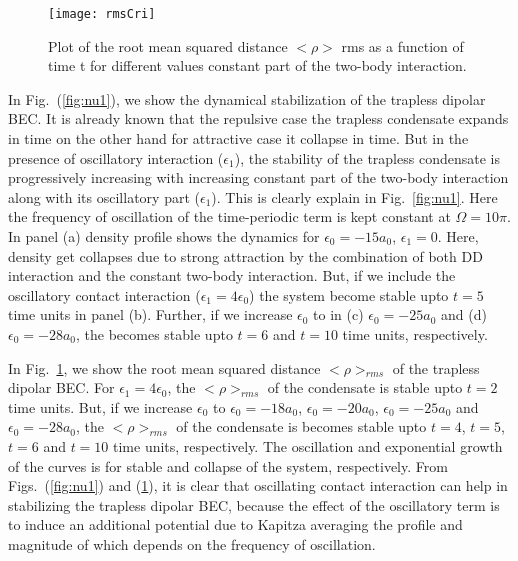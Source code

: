 \documentclass[amsmath,amssymb,article,twocolumn,superscriptaddress,showpacs,10pt]{revtex4-1}
\begin{document}
\begin{figure}[h!]
\begin{center}
\texttt{[image: rmsCri]}
\end{center}
\caption{Plot of the root mean squared distance $<\rho>$ rms as a function of time t for different values  constant part of the two-body interaction.}
\label{fig:nu1rms}
\end{figure}
In Fig.~(\ref{fig:nu1}), we show the dynamical stabilization of the trapless dipolar BEC. It is already known that the repulsive case the trapless condensate expands in time on the other hand for attractive case it collapse in time. But in the presence of oscillatory interaction ($\epsilon_{1}$), the stability of the trapless condensate is progressively increasing with increasing constant part of the two-body interaction along with its oscillatory part ($\epsilon_{1}$). This is clearly explain in Fig.~\ref{fig:nu1}. Here the frequency of oscillation of the time-periodic term is kept constant at $\Omega=10\pi$. In panel (a) density profile shows the dynamics for $\epsilon_0=-15a_0$, $\epsilon_1=0$. Here, density get collapses due to strong attraction by the combination of both DD interaction and the constant two-body interaction. But, if we include the oscillatory contact interaction ($\epsilon_1=4 \epsilon_0$) the system become stable upto $t=5$ time units in panel (b). Further, if we increase $\epsilon_0$ to in (c) $\epsilon_0=-25a_0$ and (d) $\epsilon_0=-28a_0$, the becomes stable upto $t=6$ and $t=10$ time units, respectively. 

In Fig.~\ref{fig:nu1rms}, we show the root mean squared distance $<\rho>_{rms}$ of the trapless dipolar BEC. For $\epsilon_1=4 \epsilon_0$, the $<\rho>_{rms}$ of the condensate is stable upto $t=2$ time units. But, if we increase $\epsilon_0$ to $\epsilon_0=-18a_0$, $\epsilon_0=-20a_0$, $\epsilon_0=-25a_0$ and $\epsilon_0=-28a_0$, the $<\rho>_{rms}$ of the condensate is becomes stable upto $t=4$, $t=5$, $t=6$ and $t=10$ time units, respectively. The oscillation and exponential growth of the curves is for stable and collapse of the system, respectively. From Figs.~(\ref{fig:nu1}) and (\ref{fig:nu1rms}), it is clear that oscillating contact interaction can help in stabilizing the trapless dipolar BEC, because the effect of the oscillatory term is to induce an additional potential due to Kapitza averaging \cite{Sabari:2010,Adhikari:2004,Saito:2003} the profile and magnitude of which depends on the frequency of oscillation.
\end{document}
